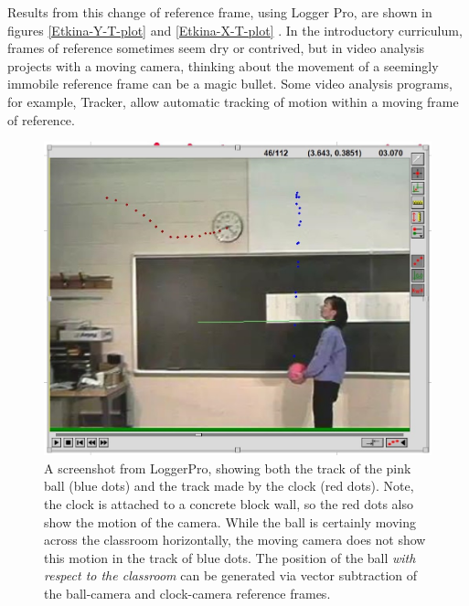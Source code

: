 \documentclass[12pt]{iopart}
\begin{document}
Results from this change of reference frame, using Logger Pro, are shown in figures \ref{Etkina-Y-T-plot} and \ref{Etkina-X-T-plot} . 
In the introductory curriculum, frames of reference sometimes seem dry or contrived, but in video analysis projects with a moving camera, thinking about the movement of a seemingly immobile reference frame can be a magic bullet.  Some video analysis programs, for example, Tracker, allow automatic tracking of motion within a moving frame of reference\cite{tracker_planets}.  

\begin{figure}[h]
\centering
\includegraphics[width=\columnwidth]{figure_3_Etkina-dots-2.jpg}
\caption{
A screenshot from LoggerPro, showing both the track of the pink ball (blue dots) and the track made by the clock (red dots).  Note, the clock is attached to a concrete block wall, so the red dots also show the motion of the camera.  
While the ball is certainly moving across the classroom horizontally, the moving camera does not show this motion in the track of blue dots.
The position of the ball \textit{with respect to the classroom} can be generated via vector subtraction of the ball-camera and clock-camera reference frames.
}
\label{Etkina-dots-2}
\end{figure}
\end{document}
